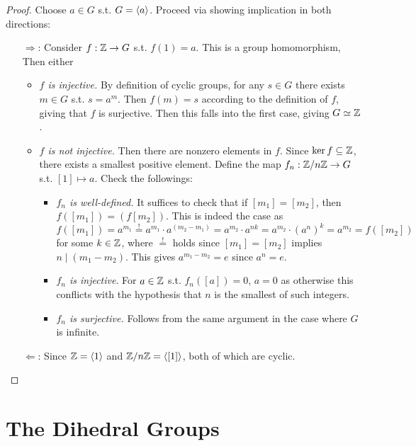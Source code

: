\documentclass{article}
\begin{document}
\begin{proof}
    Choose $a \in G$ s.t. $G = \left\langle a \right\rangle$. Proceed via showing implication in both directions:
    \begin{enumerate}
        \item[$\Rightarrow$:] Consider $f: \mathbb{Z} \to G$ s.t. $f(1) = a$. This is a group homomorphism,  Then either
        \begin{itemize}
            \item \emph{$f$ is injective.} By definition of cyclic groups, for any $s \in G$ there exists $m \in G$ s.t. $s = a^m$. Then $f(m) = s$ according to the definition of $f$, giving that $f$ is surjective. Then this falls into the first case, giving $G \simeq \mathbb{Z}$.
            \item \emph{$f$ is not injective.} Then there are nonzero elements in $f$. Since $\ker f \subseteq \mathbb{Z}$, there exists a smallest positive element. Define the map $f_n: \mathbb{Z}/n\mathbb{Z} \to G$ s.t. $[1] \mapsto a$. Check the followings:
            \begin{itemize}
                \item \emph{$f_n$ is well-defined.} It suffices to check that if $[m_1] = [m_2]$, then $f([m_1]) = (f[m_2])$. This is indeed the case as
                \[
                    f([m_1]) = a^{m_1} \overset{!}{=} a^{m_1} \cdot a^{(m_2 - m_1)} = a^{m_2} \cdot a^{nk} = a^{m_2} \cdot (a^n)^k = a^{m_2} = f([m_2])
                \]
                for some $k \in \mathbb{Z}$, where $\overset{!}{=}$ holds since $[m_1] = [m_2]$ implies $n \mid (m_1 - m_2)$. This gives $a^{m_1 - m_2} = e$ since $a^n = e$. 
                \item \emph{$f_n$ is injective}. For $a \in \mathbb{Z}$ s.t. $f_n([a]) = 0$, $a = 0$ as otherwise this conflicts with the hypothesis that $n$ is the smallest of such integers. 
                \item \emph{$f_n$ is surjective.} Follows from the same argument in the case where $G$ is infinite.
            \end{itemize}
        \end{itemize}
        \item[$\Leftarrow$:] Since $\mathbb{Z} = \left\langle 1 \right\rangle$ and $\mathbb{Z}/n\mathbb{Z} = \left\langle [1] \right\rangle$, both of which are cyclic. 
    \end{enumerate}
\end{proof}

\section{The Dihedral Groups}
\end{document}
